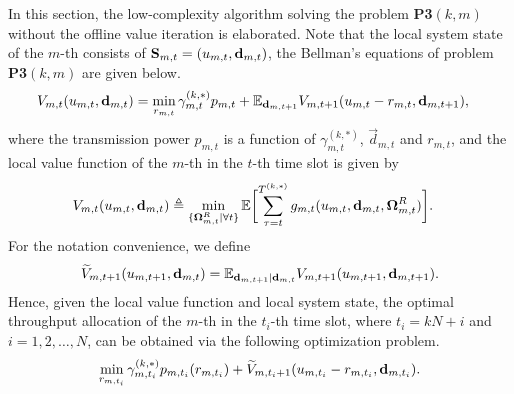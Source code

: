 In this section, the low-complexity algorithm solving the problem \textbf{P3$(k,m)$} without the offline value iteration is elaborated. Note that the local system state of the $m$-th {\IAV} consists of $\mathbf{S}_{m,t} =  ( u_{m,t}, \mathbf{d}_{m,t} )$, the Bellman's equations of problem \textbf{P3$(k,m)$} are given below.
\begin{align*}
    V_{m,t} & (  u_{m,t}, \mathbf{d}_{m,t} )=
    \min_{ r_{m,t} } \gamma^{(k,*)}_{m,t} p_{m,t} + \mathbb{E}_{ \mathbf{d}_{m,t+1} } V_{m,t+1}(  u_{m,t}-r_{m,t}, \mathbf{d}_{m,t+1} ),
\end{align*}
where the transmission power $p_{m,t}$ is a function of $\gamma^{(k,*)}_{m,t}$, $\vec{d}_{m,t}$ and $r_{m,t}$, and the local value function of the $m$-th {\IAV} in the $t$-th time slot is given by
\begin{align}
    V_{m,t} & (u_{m,t}, \vec{d}_{m,t}) \define 
    \min_{ \{\Policy^{R}_{m,t}|\forall t\} } \mathbb{E} \Bracket{ \sum_{\tau=t}^{T^{(k,*)}} g_{m,t}(u_{m,t}, \vec{d}_{m,t}, \Policy^{R}_{m,t}) }.
\end{align}
For the notation convenience, we define
\begin{align}
    \widetilde{V}_{m,t+1}(u_{m,t+1}, \mathbf{d}_{m,t}) = \mathbb{E}_{ \mathbf{d}_{m,t+1} | \mathbf{d}_{m,t} } V_{m,t+1}(  u_{m,t+1}, \mathbf{d}_{m,t+1} ).
 \label{eqn:local_valfn_alt}
\end{align}
Hence, given the local value function and local system state, the optimal throughput allocation of the $m$-th {\IAV} in the $t_i$-th time slot, where  $t_i = kN + i$ and $i=1,2,\dots,N$, can be obtained via the following optimization problem.
\begin{align}
    \min_{ r_{m,t_i} } \gamma^{(k,*)}_{m,t_i} p_{m,t_i} (r_{m,t_i})+ \widetilde{V}_{m,t_i+1}(u_{m,t_i}-r_{m,t_i}, \mathbf{d}_{m,t_i}).
    \label{eqn:local_valfn}
\end{align}

